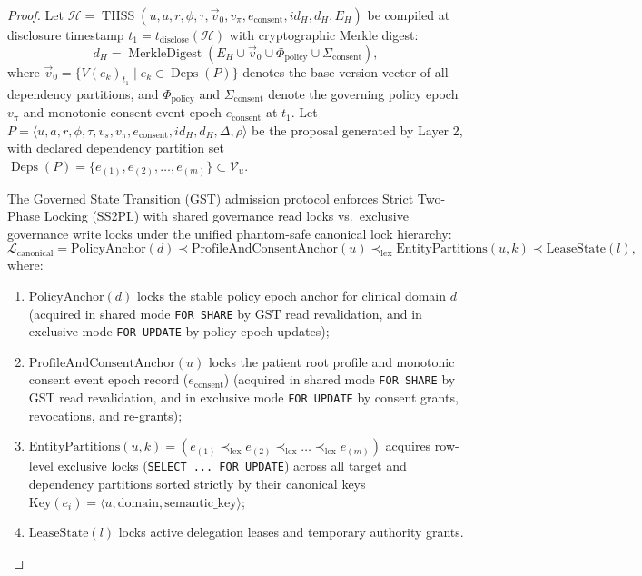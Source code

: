 \documentclass[11pt]{article}
\begin{document}
\begin{proof}
Let $\mathcal{H} = \operatorname{THSS}(u, a, r, \phi, \tau, \vec{v}_0, v_{\pi}, e_{\text{consent}}, id_H, d_H, E_H)$ be compiled at disclosure timestamp $t_1 = t_{\text{disclose}}(\mathcal{H})$ with cryptographic Merkle digest:
\begin{equation*}
d_H = \operatorname{MerkleDigest}(E_H \cup \vec{v}_0 \cup \Phi_{\text{policy}} \cup \Sigma_{\text{consent}}),
\end{equation*}
where $\vec{v}_0 = \{ V(e_k)_{t_1} \mid e_k \in \operatorname{Deps}(P) \}$ denotes the base version vector of all dependency partitions, and $\Phi_{\text{policy}}$ and $\Sigma_{\text{consent}}$ denote the governing policy epoch $v_{\pi}$ and monotonic consent event epoch $e_{\text{consent}}$ at $t_1$.
Let $P = \langle u, a, r, \phi, \tau, v_s, v_{\pi}, e_{\text{consent}}, id_H, d_H, \Delta, \rho \rangle$ be the proposal generated by Layer 2, with declared dependency partition set $\operatorname{Deps}(P) = \{e_{(1)}, e_{(2)}, \dots, e_{(m)}\} \subset \mathcal{V}_u$.

The Governed State Transition (GST) admission protocol enforces Strict Two-Phase Locking (SS2PL) with shared governance read locks vs.\ exclusive governance write locks under the unified phantom-safe canonical lock hierarchy:
\begin{equation}
\mathcal{L}_{\text{canonical}} = \text{PolicyAnchor}(d) \prec \text{ProfileAndConsentAnchor}(u) \prec_{\text{lex}} \text{EntityPartitions}(u, k) \prec \text{LeaseState}(l),
\label{eq:proof_canonical_lock_hierarchy}
\end{equation}
where:
\begin{enumerate}
    \item $\text{PolicyAnchor}(d)$ locks the stable policy epoch anchor for clinical domain $d$ (acquired in shared mode \texttt{FOR SHARE} by GST read revalidation, and in exclusive mode \texttt{FOR UPDATE} by policy epoch updates);
    \item $\text{ProfileAndConsentAnchor}(u)$ locks the patient root profile and monotonic consent event epoch record ($e_{\text{consent}}$) (acquired in shared mode \texttt{FOR SHARE} by GST read revalidation, and in exclusive mode \texttt{FOR UPDATE} by consent grants, revocations, and re-grants);
    \item $\text{EntityPartitions}(u, k) = \left( e_{(1)} \prec_{\text{lex}} e_{(2)} \prec_{\text{lex}} \dots \prec_{\text{lex}} e_{(m)} \right)$ acquires row-level exclusive locks (\texttt{SELECT ... FOR UPDATE}) across all target and dependency partitions sorted strictly by their canonical keys $\text{Key}(e_i) = \langle u, \text{domain}, \text{semantic\_key} \rangle$;
    \item $\text{LeaseState}(l)$ locks active delegation leases and temporary authority grants.
\end{enumerate}


\end{proof}
\end{document}
